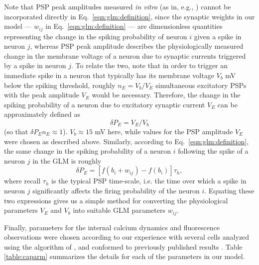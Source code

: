 \documentclass[aoas,preprint]{imsart}
\begin{document}
Note that PSP peak amplitudes measured \emph{in vitro} (as in, e.g.,
\cite{Song2005}) cannot be incorporated directly in
Eq.~\eqref{eqn:glm:definition}, since the synaptic weights in our
model --- $w_{ij}$ in Eq.~\eqref{eqn:glm:definition} --- are
dimensionless quantities representing the change in the spiking
probability of neuron $i$ given a spike in neuron $j$, whereas PSP
peak amplitude describes the physiologically measured change in the
membrane voltage of a neuron due to synaptic currents triggered by a
spike in neuron $j$.  To relate the two, note that in order to trigger
an immediate spike in a neuron that typically has its membrane voltage
$V_b$ mV below the spiking threshold, roughly $n_E = V_b / V_E$
simultaneous excitatory PSPs with the peak amplitude $V_E$ would be
necessary.  Therefore, the change in the spiking probability of a
neuron due to excitatory synaptic current $V_E$ can be approximately
defined as
\begin{equation}\label{eqn:convert:leadin-1}
\delta P_E = V_E/V_b
\end{equation}
(so that $\delta P_E n_E \approx 1$).  $V_b \approx 15$ mV here, while
values for the PSP amplitude $V_E$ were chosen as described above.
Similarly, according to Eq.~\ref{eqn:glm:definition}, the same change
in the spiking probability of a neuron $i$ following the spike of a
neuron $j$ in the GLM is roughly
\begin{equation}\label{eqn:convert:leadin-2}
\delta P_E = \left[ f(b_i + w_{ij}) - f(b_i) \right] \tau_h,
\end{equation}
where recall $\tau_h$ is the typical PSP time-scale, i.e. the time
over which a spike in neuron $j$ significantly affects the firing
probability of the neuron $i$.  Equating these two expressions gives
us a simple method for converting the physiological parameters $V_E$
and $V_b$ into suitable GLM parameters $w_{ij}$.

Finally, parameters for the internal calcium dynamics and fluorescence
observations were chosen according to our experience with several
cells analyzed using the algorithm of \cite{Vogelstein2009}, and
conformed to previously published results
\cite{ImagingManual,HelmchenSakmann96,BrenowitzRegehr07}. Table
\ref{table:caparm} summarizes the details for each of the parameters
in our model.
\end{document}
